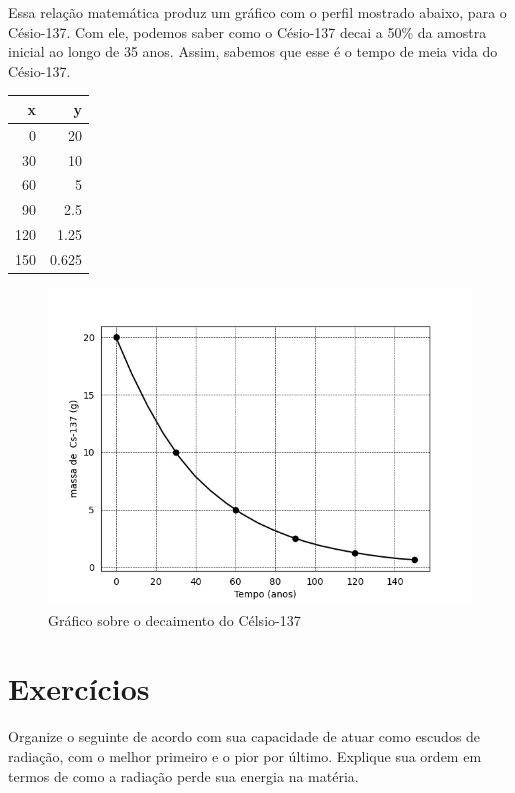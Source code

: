 \documentclass[11pt]{article}
\begin{document}
\begin{multicols}{2}
Essa relação matemática produz um gráfico com o perfil mostrado abaixo, para o Césio-137. Com ele, podemos saber como o Césio-137 decai a 50\% da amostra inicial ao longo de 35 anos. Assim, sabemos que esse é o tempo de meia vida do Césio-137.


\begin{table}[htbp]
\label{dataCesio}
\centering
\begin{tabular}{rr}
x & y\\
\hline
0 & 20\\
30 & 10\\
60 & 5\\
90 & 2.5\\
120 & 1.25\\
150 & 0.625\\
\end{tabular}
\end{table}

\begin{figure}[H]
\centering
\includegraphics[scale=0.5]{./../QM/decai-curva.png}
\caption{Gráfico sobre o decaimento do Célsio-137}
\end{figure}

\section{Exercícios}
\label{sec:orgc0bed51}

\begin{questions}
\begin{exercise}
Organize o seguinte de acordo com sua capacidade de atuar como escudos de radiação, com o melhor primeiro e o pior por último. Explique sua ordem em termos de como a radiação perde sua energia na matéria.


\end{exercise}
\end{questions}
\end{multicols}
\end{document}
